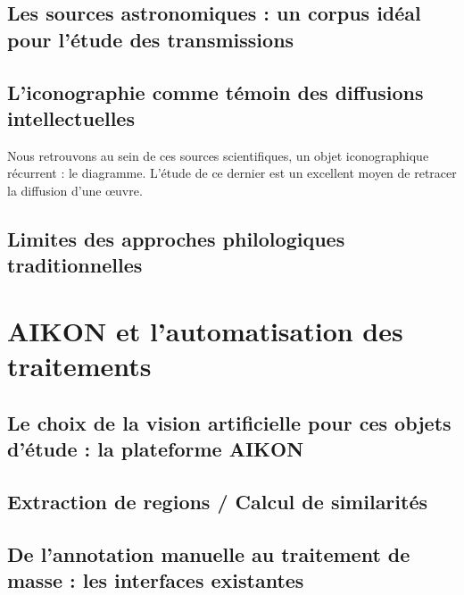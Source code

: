 \documentclass[a4paper,12pt,twoside]{book}
\newcommand{\clearemptydoublepage}{\newpage{\pagestyle{empty}\cleardoublepage}}
\begin{document}
	\section[Un corpus idéal pour l'étude des transmissions]{Les sources astronomiques : un corpus idéal pour l'étude des transmissions}
	

	
	
	
	\section[L'iconographie témoin des diffusions intellectuelles]{L'iconographie comme témoin des diffusions intellectuelles}


	Nous retrouvons au sein de ces sources scientifiques, un objet iconographique récurrent : le diagramme. L'étude de ce dernier est un excellent moyen de retracer la diffusion d'une œuvre.
	


	
	\section{Limites des approches philologiques traditionnelles}
	
	
	
	
	
	\clearemptydoublepage
	
	\chapter{AIKON et l'automatisation des traitements}
	\section{Le choix de la vision artificielle pour ces objets d'étude : la plateforme AIKON}
	
	
	\section{Extraction de regions / Calcul de similarités}
	
	
	\section{De l'annotation manuelle au traitement de masse : les interfaces existantes}
	
	
\end{document}
